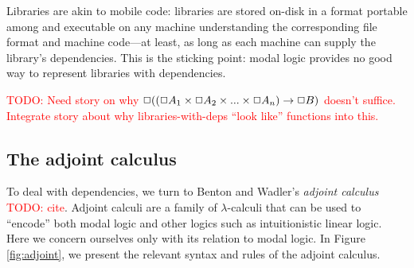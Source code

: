 \documentclass[11pt]{article}
\newcommand{\todo}[1]{\textcolor{red}{\small TODO: #1}}
\begin{document}

Libraries are akin to mobile code: libraries are stored on-disk in a format
portable among and executable on any machine understanding the corresponding
file format and machine code---at least, as long as each machine can supply the
library's dependencies. This is the sticking point: modal logic provides no good
way to represent libraries with dependencies.

\todo{Need story on why $\Box((\Box A_1 \times \Box A_2 \times ... \times \Box A_n) \to \Box
  B)$ doesn't suffice. Integrate story about why libraries-with-deps ``look
  like'' functions into this.}



\subsection{The adjoint calculus}

To deal with dependencies, we turn to Benton and Wadler's \emph{adjoint
  calculus} \todo{cite}. Adjoint calculi are a family of $\lambda$-calculi that
can be used to ``encode'' both modal logic and other logics such as
intuitionistic linear logic. Here we concern ourselves only with its relation to
modal logic. In Figure \ref{fig:adjoint}, we present the relevant syntax and
rules of the adjoint calculus.
\end{document}
